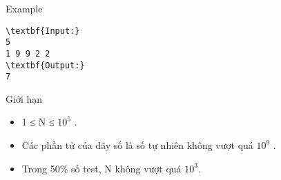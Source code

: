 Example
\begin{verbatim}
\textbf{Input:}
5
1 9 9 2 2
\textbf{Output:}
7\end{verbatim}
Giới hạn
\begin{itemize}
	\item 1 ≤ N ≤ $10^{5}$ .
	\item Các phần tử của dãy số là số tự nhiên không vượt quá $10^{9}$ .
	\item Trong 50\% số test, N không vượt quá $10^{3}$.
\end{itemize}